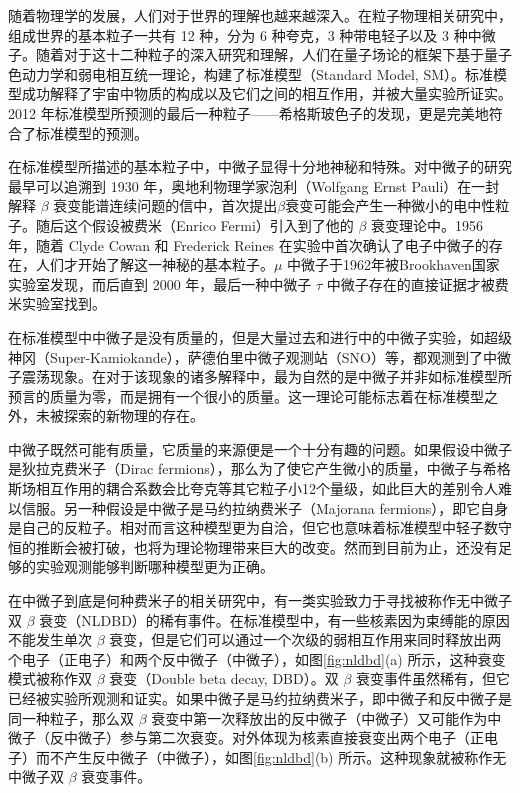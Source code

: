 
随着物理学的发展，人们对于世界的理解也越来越深入。在粒子物理相关研究中，组成世界的基本粒子一共有 12 种，分为 6 种夸克，3 种带电轻子以及 3 种中微子。随着对于这十二种粒子的深入研究和理解，人们在量子场论的框架下基于量子色动力学和弱电相互统一理论，构建了标准模型（Standard Model, SM）。标准模型成功解释了宇宙中物质的构成以及它们之间的相互作用，并被大量实验所证实。2012 年标准模型所预测的最后一种粒子——希格斯玻色子的发现，更是完美地符合了标准模型的预测。

在标准模型所描述的基本粒子中，中微子显得十分地神秘和特殊。对中微子的研究最早可以追溯到 1930 年，奥地利物理学家泡利（Wolfgang Ernst Pauli）在一封解释 $\beta$ 衰变能谱连续问题的信中，首次提出$\beta$衰变可能会产生一种微小的电中性粒子。随后这个假设被费米（Enrico Fermi）引入到了他的 $\beta$ 衰变理论中\supercite{wilson1968fermi}。1956 年，随着 Clyde Cowan 和 Frederick Reines 在实验中首次确认了电子中微子的存在\supercite{cowan1991detection}，人们才开始了解这一神秘的基本粒子。$\mu$ 中微子于1962年被Brookhaven国家实验室发现\supercite{danby1962observation}，而后直到 2000 年，最后一种中微子 $\tau$ 中微子存在的直接证据才被费米实验室找到\supercite{kodama2001observation}。

在标准模型中中微子是没有质量的，但是大量过去和进行中的中微子实验，如超级神冈（Super-Kamiokande）\supercite{fukuda1998evidence}，萨德伯里中微子观测站（SNO）\supercite{ahmad2002direct}等，都观测到了中微子震荡现象。在对于该现象的诸多解释中，最为自然的是中微子并非如标准模型所预言的质量为零，而是拥有一个很小的质量。这一理论可能标志着在标准模型之外，未被探索的新物理的存在。

中微子既然可能有质量，它质量的来源便是一个十分有趣的问题。如果假设中微子是狄拉克费米子（Dirac fermions），那么为了使它产生微小的质量，中微子与希格斯场相互作用的耦合系数会比夸克等其它粒子小12个量级，如此巨大的差别令人难以信服。另一种假设是中微子是马约拉纳费米子（Majorana fermions），即它自身是自己的反粒子。相对而言这种模型更为自洽，但它也意味着标准模型中轻子数守恒的推断会被打破，也将为理论物理带来巨大的改变。然而到目前为止，还没有足够的实验观测能够判断哪种模型更为正确\supercite{zhoushun}。

在中微子到底是何种费米子的相关研究中，有一类实验致力于寻找被称作无中微子双 $\beta$ 衰变（NLDBD）\supercite{avignone2008double}的稀有事件。在标准模型中，有一些核素因为束缚能的原因不能发生单次 $\beta$ 衰变，但是它们可以通过一个次级的弱相互作用来同时释放出两个电子（正电子）和两个反中微子（中微子），如图\ref{fig:nldbd}(a) 所示，这种衰变模式被称作双 $\beta$ 衰变（Double beta decay, DBD）。双 $\beta$ 衰变事件虽然稀有，但它已经被实验所观测和证实。如果中微子是马约拉纳费米子，即中微子和反中微子是同一种粒子，那么双 $\beta$ 衰变中第一次释放出的反中微子（中微子）又可能作为中微子（反中微子）参与第二次衰变。对外体现为核素直接衰变出两个电子（正电子）而不产生反中微子（中微子），如图\ref{fig:nldbd}(b) 所示。这种现象就被称作无中微子双 $\beta$ 衰变事件。

